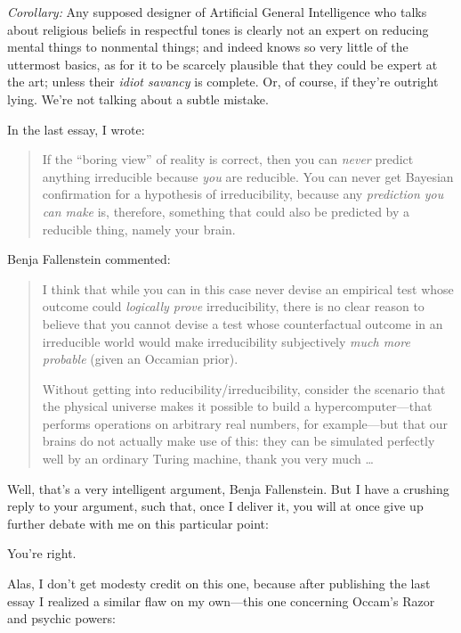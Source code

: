 {
 \textit{Corollary:} Any supposed designer of Artificial General
Intelligence who talks about religious beliefs in respectful tones is
clearly not an expert on reducing mental things to nonmental things;
and indeed knows so very little of the uttermost basics, as for it to
be scarcely plausible that they could be expert at the art; unless
their \textit{idiot savancy} is complete. Or, of course, if
they're outright lying. We're not
talking about a subtle mistake.}

\myendsectiontext


{
 In the last essay, I wrote:}

\begin{quote}
{
 If the ``boring view'' of
reality is correct, then you can \textit{never} predict anything
irreducible because \textit{you} are reducible. You can never get
Bayesian confirmation for a hypothesis of irreducibility, because any
\textit{prediction you can make} is, therefore, something that could
also be predicted by a reducible thing, namely your brain.}
\end{quote}

{
 Benja Fallenstein commented:}

\begin{quotation}
{
 I think that while you can in this case never devise an empirical
test whose outcome could \textit{logically prove} irreducibility, there
is no clear reason to believe that you cannot devise a test whose
counterfactual outcome in an irreducible world would make
irreducibility subjectively \textit{much more probable} (given an
Occamian prior).}

{
 Without getting into reducibility/irreducibility, consider the
scenario that the physical universe makes it possible to build a
hypercomputer---that performs operations on arbitrary real numbers, for
example---but that our brains do not actually make use of this: they
can be simulated perfectly well by an ordinary Turing machine, thank
you very much \ldots}
\end{quotation}

{
 Well, that's a very intelligent argument, Benja
Fallenstein. But I have a crushing reply to your argument, such that,
once I deliver it, you will at once give up further debate with me on
this particular point:}

{
 You're right.}

{
 Alas, I don't get modesty credit on this one,
because after publishing the last essay I realized a similar flaw on my
own---this one concerning Occam's Razor and psychic
powers:}

